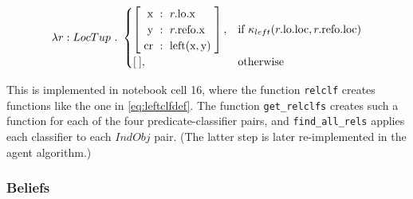 \begin{equation}\label{eq:leftclfdef}
\lambda r : LocTup \ .\ 
\begin{cases}
\rec{
    \text{x} &:& r.\text{lo}.\text{x} \\
    \text{y} &:& r.\text{refo}.\text{x} \\
    \text{cr} &:& \text{left}(\text{x}, \text{y}) \\
},
& \text{if } \kappa_{left}(r.\text{lo}.\text{loc}, r.\text{refo}.\text{loc}) \\
[\:], & \text{otherwise}
\end{cases}
\end{equation}

This is implemented in notebook cell 16, where the function \texttt{relclf} creates functions like the one in \autoref{eq:leftclfdef}.
The function \texttt{get\_relclfs} creates such a function for each of the four predicate-classifier pairs, and \texttt{find\_all\_rels} applies each classifier to each $IndObj$ pair.
(The latter step is later re-implemented in the agent algorithm.)

\subsubsection{Beliefs}

